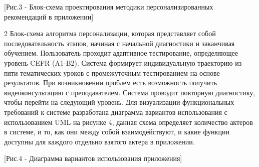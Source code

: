 [Рис.3 - Блок-схема проектирования методики персонализированных
рекомендаций в приложении]

\begin{multicols}{2}
Блок-схема алгоритма персонализации, которая представляет собой
последовательность этапов, начиная с начальной диагностики и заканчивая
обучением. Пользователь проходит адаптивное тестирование, определяющее
уровень CEFR (A1-B2). Система формирует индивидуальную траекторию из
пяти тематических уроков с промежуточным тестированием на основе
результатов. При возникновении проблем есть возможность получить
видеоконсультацию с преподавателем. Система проводит повторную
диагностику, чтобы перейти на следующий уровень. Для визуализации
функциональных требований к системе разработана диаграмма вариантов
использования с использованием UML на рисунке 4, данная схема определяет
количество актеров в системе, и то, как они между собой взаимодействуют,
и какие функции доступны для каждого отдельно взятого актера в
приложении.
\end{multicols}

[Рис.4 - Диаграмма вариантов использования приложения]

